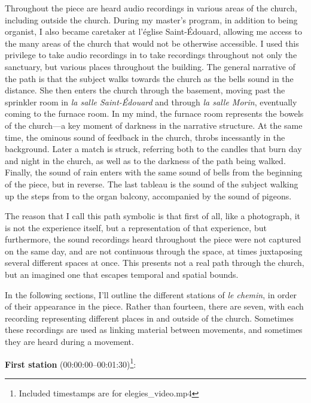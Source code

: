 \documentclass[12pt,twoside,maitrise]{dms_ks}
\theoremstyle{definition}
\begin{document}
{Throughout the piece are heard audio recordings in various areas of the church, including outside the church. 
During my master's program, in addition to being organist, I also became caretaker at l'église Saint-Édouard, allowing me access to the many areas of the church that would not be otherwise accessible. 
I used this privilege to take audio recordings in to take recordings throughout not only the sanctuary, but various places throughout the building. 
The general narrative of the path is that the subject walks towards the church as the bells sound in the distance. 
She then enters the church through the basement, moving past the sprinkler room in \textit{la salle Saint-Édouard} and through \textit{la salle Morin}, eventually coming to the furnace room. 
In my mind, the furnace room represents the bowels of the church---a key moment of darkness in the narrative structure. 
At the same time, the ominous sound of feedback in the church, throbs incessantly in the background. 
Later a match is struck, referring both to the candles that burn day and night in the church, as well as to the darkness of the path being walked. 
Finally, the sound of rain enters with the same sound of bells from the beginning of the piece, but in reverse. 
The last tableau is the sound of the subject walking up the steps from to the organ balcony, accompanied by the sound of pigeons.

The reason that I call this path symbolic is that first of all, like a photograph, it is not the experience itself, but a representation of that experience, but furthermore, the sound recordings heard throughout the piece were not captured on the same day, and are not continuous through the space, at times juxtaposing several different spaces at once. 
This presents not a real path through the church, but an imagined one that escapes temporal and spatial bounds.

In the following sections, I'll outline the different stations of \textit{le chemin}, in order of their appearance in the piece. 
Rather than fourteen, there are seven, with each recording representing different places in and outside of the church. 
Sometimes these recordings are used as linking material between movements, and sometimes they are heard during a movement.

\textbf{First station} (00:00:00--00:01:30)\footnote{Included timestamps are for elegies_video.mp4}:

}
\end{document}
